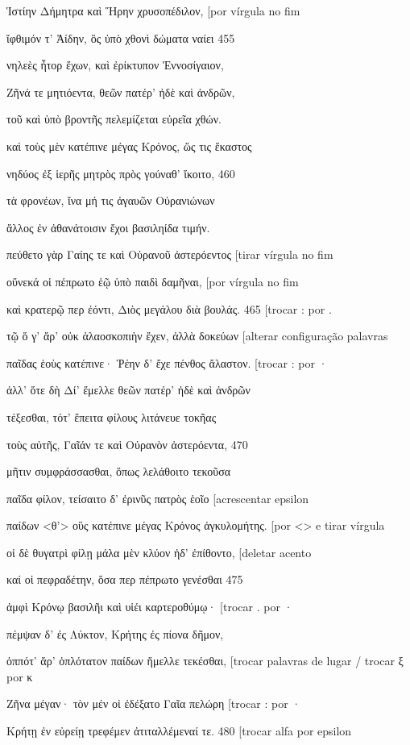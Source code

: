 Ἱστίην Δήμητρα καὶ Ἥρην χρυσοπέδιλον, {[}por vírgula no fim

ἴφθιμόν τ' Ἀίδην, ὃς ὑπὸ χθονὶ δώματα ναίει 455

νηλεὲς ἦτορ ἔχων, καὶ ἐρίκτυπον Ἐννοσίγαιον,

Ζῆνά τε μητιόεντα, θεῶν πατέρ' ἠδὲ καὶ ἀνδρῶν,

τοῦ καὶ ὑπὸ βροντῆς πελεμίζεται εὐρεῖα χθών.

καὶ τοὺς μὲν κατέπινε μέγας Κρόνος, ὥς τις ἕκαστος

νηδύος ἐξ ἱερῆς μητρὸς πρὸς γούναθ' ἵκοιτο, 460

τὰ φρονέων, ἵνα μή τις ἀγαυῶν Οὐρανιώνων

ἄλλος ἐν ἀθανάτοισιν ἔχοι βασιληίδα τιμήν.

πεύθετο γὰρ Γαίης τε καὶ Οὐρανοῦ ἀστερόεντος {[}tirar vírgula no fim

οὕνεκά οἱ πέπρωτο ἑῷ ὑπὸ παιδὶ δαμῆναι, {[}por vírgula no fim

καὶ κρατερῷ περ ἐόντι, Διὸς μεγάλου διὰ βουλάς. 465 {[}trocar : por .

τῷ ὅ γ' ἄρ' οὐκ ἀλαοσκοπιὴν ἔχεν, ἀλλὰ δοκεύων {[}alterar configuração
palavras

παῖδας ἑοὺς κατέπινε· Ῥέην δ' ἔχε πένθος ἄλαστον. {[}trocar : por ·

ἀλλ' ὅτε δὴ Δί' ἔμελλε θεῶν πατέρ' ἠδὲ καὶ ἀνδρῶν

τέξεσθαι, τότ' ἔπειτα φίλους λιτάνευε τοκῆας

τοὺς αὐτῆς, Γαῖάν τε καὶ Οὐρανὸν ἀστερόεντα, 470

μῆτιν συμφράσσασθαι, ὅπως λελάθοιτο τεκοῦσα

παῖδα φίλον, τείσαιτο δ' ἐρινῦς πατρὸς ἑοῖο {[}acrescentar epsilon

παίδων \textless{}θ'\textgreater{} οὓς κατέπινε μέγας Κρόνος
ἀγκυλομήτης. {[}por \textless{}\textgreater{} e tirar vírgula

οἱ δὲ θυγατρὶ φίλῃ μάλα μὲν κλύον ἠδ' ἐπίθοντο, {[}deletar acento

καί οἱ πεφραδέτην, ὅσα περ πέπρωτο γενέσθαι 475

ἀμφὶ Κρόνῳ βασιλῆι καὶ υἱέι καρτεροθύμῳ· {[}trocar . por ·

πέμψαν δ' ἐς Λύκτον, Κρήτης ἐς πίονα δῆμον,

ὁππότ' ἄρ' ὁπλότατον παίδων ἤμελλε τεκέσθαι, {[}trocar palavras de lugar
/ trocar ξ por κ

Ζῆνα μέγαν· τὸν μέν οἱ ἐδέξατο Γαῖα πελώρη {[}trocar : por ·

Κρήτῃ ἐν εὐρείῃ τρεφέμεν ἀτιταλλέμεναί τε. 480 {[}trocar alfa por
epsilon

